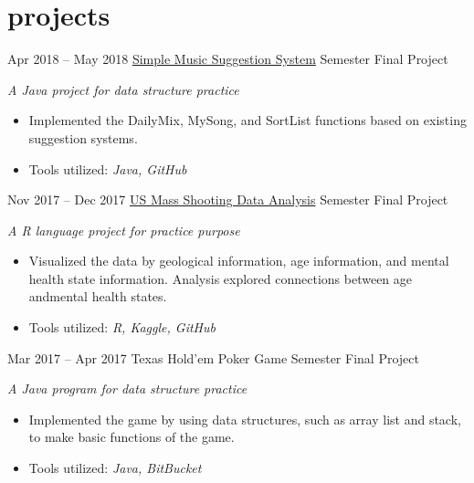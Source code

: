 \documentclass[]{friggeri-cv}
\begin{document}
\section{projects}
\begin{entrylist}
  \entry
    {Apr 2018 -- May 2018}
    {\href{https://github.com/TravisThomasAC/cs250-FinalProject-Team9}{Simple Music Suggestion System}}
    {Semester Final Project}
    {\emph{A Java project for data structure practice}
    \begin{itemize}[leftmargin=1.2em]
    \item Implemented the DailyMix, MySong, and SortList functions based on existing suggestion systems.
    \item Tools utilized: \emph{Java, GitHub}
    \end{itemize}}
  \entry
    {Nov 2017 -- Dec 2017}
    {\href{https://github.com/liux2/cs390f2017-project}{US Mass Shooting Data Analysis}}
    {Semester Final Project}
    {\emph{A R language project for practice purpose}
    \begin{itemize}[leftmargin=1.2em]
    \item Visualized the data by geological information, age information, and mental health state information. Analysis explored connections between age andmental health states.
    \item Tools utilized: \emph{R, Kaggle, GitHub}
    \end{itemize}}
  \entry
    {Mar 2017 -- Apr 2017}
    {Texas Hold’em Poker Game}
    {Semester Final Project}
    {\emph{A Java program for data structure practice}
    \begin{itemize}[leftmargin=1.2em]
    \item Implemented the game by using data structures, such as array list and stack, to make basic functions of the game.
    \item Tools utilized: \emph{Java, BitBucket}
    \end{itemize}}
\end{entrylist}
\end{document}
